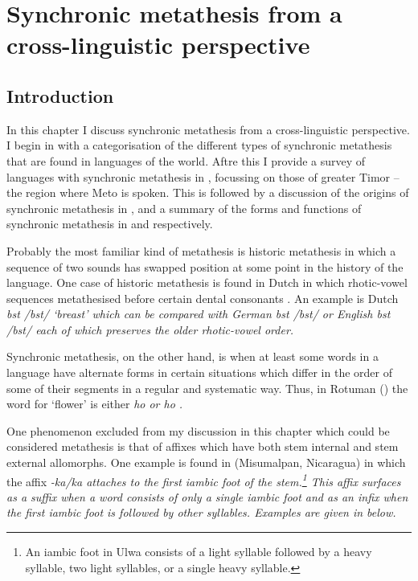 \chapter{Synchronic metathesis from a cross-linguistic perspective} \label{ch:SynchMet}

\section{Introduction}
In this chapter I discuss synchronic metathesis
from a cross-linguistic perspective.
I begin in  with a categorisation
of the different types of synchronic metathesis
that are found in languages of the world.
Aftre this I provide a survey of languages with
synchronic metathesis in , focussing on those
of greater Timor -- the region where Meto is spoken.
This is followed by a discussion of the origins of
synchronic metathesis in , and
a summary of the forms and functions of synchronic metathesis
in  and  respectively.

Probably the most familiar kind of metathesis is historic metathesis
in which a sequence of two sounds has swapped
position at some point in the history of the language.
One case of historic metathesis is found in Dutch
in which rhotic-vowel sequences metathesised
before certain dental consonants \citep[108]{va17}.
An example is Dutch \it{bst} /bst/ `breast'
which can be compared with German \it{bst} /bst/
or English \it{bst} /bst/ each of
which preserves the older rhotic-vowel order.

Synchronic metathesis, on the other hand,
is when at least some words in a language
have alternate forms in certain situations
which differ in the order of some of their segments in a regular and systematic way.
Thus, in Rotuman () the word for `flower'
is either \it{ho} or \it{ho} \citep[14]{ch40}.

One phenomenon excluded from my discussion in this chapter
which could be considered metathesis
is that of affixes which have both stem internal and stem external allomorphs.
One example is found in  (Misumalpan, Nicaragua)
in which the  affix \it{-ka/\<ka\>}
attaches to the first iambic foot of the stem.\footnote{
		An iambic foot in Ulwa consists of a light syllable followed by a heavy syllable,
		two light syllables, or a single heavy syllable.}
This affix surfaces as a suffix when a word consists of only a single iambic foot
and as an infix when the first iambic foot is followed by other syllables.
Examples are given in  below.

